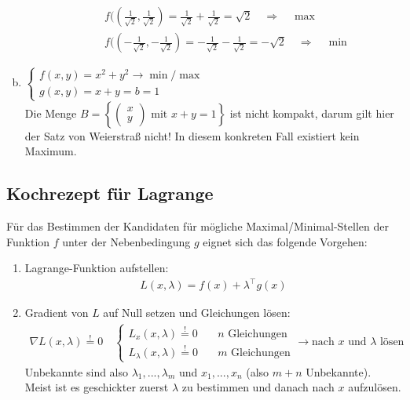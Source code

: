 \documentclass[11pt,a4paper]{book}
\newcommand{\1}    	{\mathbbm{1}}
\newcommand{\mitt}	{\textrm{ mit }}
\begin{document}
\begin{enumerate}[a.~]
\begin{enumerate}[(i)]
\begin{align*}
			&f(\left(\frac{1}{\sqrt{2}}, \frac{1}{\sqrt{2}}\right) = \frac{1}{\sqrt{2}} + \frac{1}{\sqrt{2}} = \sqrt{2} \quad\Rightarrow\quad \max \\
			&f(\left(-\frac{1}{\sqrt{2}}, -\frac{1}{\sqrt{2}}\right) = -\frac{1}{\sqrt{2}} - \frac{1}{\sqrt{2}} = -\sqrt{2} \quad\Rightarrow\quad \min			
		\end{align*}
	\end{enumerate}
	\item \( \left\{ \begin{array}{l}
		f(x,y) = x^2+y^2 \rightarrow \min/\max \\
		g(x,y) = x + y = b = 1
	\end{array} \right. \) \\
	Die Menge \(B = \left\{ \left( \begin{array}{c} x \\ y \end{array} \right) \mitt x + y = 1 \right\}\) ist nicht kompakt, darum gilt hier der Satz von Weierstraß nicht! In diesem konkreten Fall existiert kein Maximum.
\end{enumerate}

\subsection{Kochrezept für Lagrange}
Für das Bestimmen der Kandidaten für mögliche Maximal/Minimal-Stellen der Funktion \(f\) unter der Nebenbedingung \(g\) eignet sich das folgende Vorgehen:
\begin{enumerate}[1.~]
	\item Lagrange-Funktion aufstellen:
	\begin{align*}
		L(x,\lambda) = f(x) + \lambda^\top g(x)
	\end{align*}
	\item Gradient von \(L\) auf Null setzen und Gleichungen lösen:
	\begin{align*}
		\nabla L(x,\lambda) \stackrel{!}{=} 0 \quad 
		\left\{ \begin{array}{ll}
			L_x (x,\lambda) \stackrel{!}{=} 0 &\quad n \textrm{ Gleichungen} \\
			L_\lambda(x,\lambda) \stackrel{!}{=} 0 &\quad m \textrm{ Gleichungen}
		\end{array} \right. \rightarrow \textrm{nach }x\textrm{ und }\lambda\textrm{ lösen}
	\end{align*}
	Unbekannte sind also \(\lambda_1, ..., \lambda_m\) und \(x_1, ..., x_n\) (also \(m + n\) Unbekannte).\\
	Meist ist es geschickter zuerst \(\lambda\) zu bestimmen und danach nach \(x\) aufzulösen.
\end{enumerate}
\end{document}
